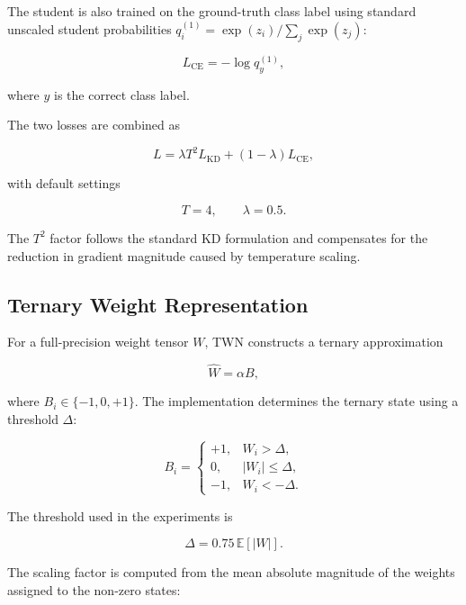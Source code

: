 \documentclass[conference]{IEEEtran}
\begin{document}
The student is also trained on the ground-truth class label using standard
unscaled student probabilities $q_i^{(1)}=\exp(z_i)/\sum_j\exp(z_j)$:

\begin{equation}
L_{\mathrm{CE}}
=
-\log q_y^{(1)},
\end{equation}

where $y$ is the correct class label.

The two losses are combined as

\begin{equation}
L =
\lambda T^2 L_{\mathrm{KD}}
+
(1-\lambda)L_{\mathrm{CE}},
\end{equation}

with default settings

\begin{equation}
T=4,
\qquad
\lambda=0.5.
\end{equation}

The $T^2$ factor follows the standard KD formulation and compensates
for the reduction in gradient magnitude caused by temperature scaling.

\subsection{Ternary Weight Representation}

For a full-precision weight tensor $W$, TWN constructs a ternary
approximation

\begin{equation}
\hat{W} = \alpha B,
\end{equation}

where $B_i \in \{-1,0,+1\}$. The implementation determines the ternary
state using a threshold $\Delta$:

\begin{equation}
B_i =
\begin{cases}
+1, & W_i > \Delta,\\
0, & |W_i| \leq \Delta,\\
-1, & W_i < -\Delta.
\end{cases}
\end{equation}

The threshold used in the experiments is

\begin{equation}
\Delta =
0.75\,\mathbb{E}[|W|].
\end{equation}

The scaling factor is computed from the mean absolute magnitude of the
weights assigned to the non-zero states:
\end{document}
